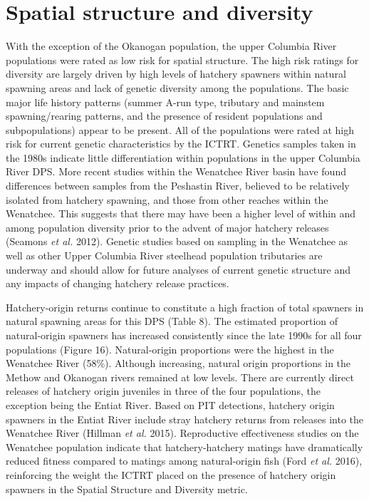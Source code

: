 \documentclass[
  letterpaper,
  oneside,
  open=any]{scrbook}
\begin{document}
\hypertarget{spatial-structure-and-diversity}{%
\section{Spatial structure and
diversity}\label{spatial-structure-and-diversity}}

With the exception of the Okanogan population, the upper Columbia River
populations were rated as low risk for spatial structure. The high risk
ratings for diversity are largely driven by high levels of hatchery
spawners within natural spawning areas and lack of genetic diversity
among the populations. The basic major life history patterns (summer
A-run type, tributary and mainstem spawning/rearing patterns, and the
presence of resident populations and subpopulations) appear to be
present. All of the populations were rated at high risk for current
genetic characteristics by the ICTRT. Genetics samples taken in the
1980s indicate little differentiation within populations in the upper
Columbia River DPS. More recent studies within the Wenatchee River basin
have found differences between samples from the Peshastin River,
believed to be relatively isolated from hatchery spawning, and those
from other reaches within the Wenatchee. This suggests that there may
have been a higher level of within and among population diversity prior
to the advent of major hatchery releases (Seamons \emph{et al.} 2012).
Genetic studies based on sampling in the Wenatchee as well as other
Upper Columbia River steelhead population tributaries are underway and
should allow for future analyses of current genetic structure and any
impacts of changing hatchery release practices.

Hatchery-origin returns continue to constitute a high fraction of total
spawners in natural spawning areas for this DPS (Table 8). The estimated
proportion of natural-origin spawners has increased consistently since
the late 1990s for all four populations (Figure 16). Natural-origin
proportions were the highest in the Wenatchee River (58\%). Although
increasing, natural origin proportions in the Methow and Okanogan rivers
remained at low levels. There are currently direct releases of hatchery
origin juveniles in three of the four populations, the exception being
the Entiat River. Based on PIT detections, hatchery origin spawners in
the Entiat River include stray hatchery returns from releases into the
Wenatchee River (Hillman \emph{et al.} 2015). Reproductive effectiveness
studies on the Wenatchee population indicate that hatchery-hatchery
matings have dramatically reduced fitness compared to matings among
natural-origin fish (Ford \emph{et al.} 2016), reinforcing the weight
the ICTRT placed on the presence of hatchery origin spawners in the
Spatial Structure and Diversity metric.
\end{document}
